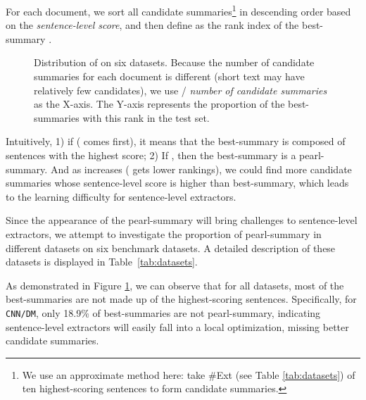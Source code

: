 \documentclass[11pt,a4paper]{article}
\begin{document}
For each document, we sort all candidate summaries\footnote{We use an approximate method here: take \#Ext (see Table \ref{tab:datasets}) of ten highest-scoring sentences to form candidate summaries.} in descending order based on the \textit{sentence-level score},
and then define  as the rank index of the best-summary .

\begin{figure}[ht!]
  \centering
{}
 \caption{Distribution of  on six datasets. Because the number of candidate summaries for each document is different (short text may have relatively few candidates), we use  / \textit{number of candidate summaries} as the X-axis. The Y-axis represents the proportion of the best-summaries with this rank in the test set.}
 \label{fig:dataset_fusion}
\end{figure}

Intuitively,
1) if  ( comes first), it means that the best-summary is composed of sentences with the highest score;
2) If , then the best-summary is a pearl-summary. And as  increases ( gets lower rankings), we could find more candidate summaries whose sentence-level score is higher than best-summary, which leads to the learning difficulty for sentence-level extractors.

Since the appearance of the pearl-summary will bring challenges to sentence-level extractors, we attempt to investigate the proportion of pearl-summary in different datasets on six benchmark datasets. A detailed description of these datasets is displayed in Table~\ref{tab:datasets}.




As demonstrated in Figure \ref{fig:dataset_fusion}, we can observe that for all datasets,  most of the best-summaries are not made up of the highest-scoring sentences.
Specifically, for \texttt{CNN/DM}, only 18.9\% of best-summaries are not pearl-summary, indicating sentence-level extractors will easily fall into a local optimization, missing better candidate summaries.
\end{document}
